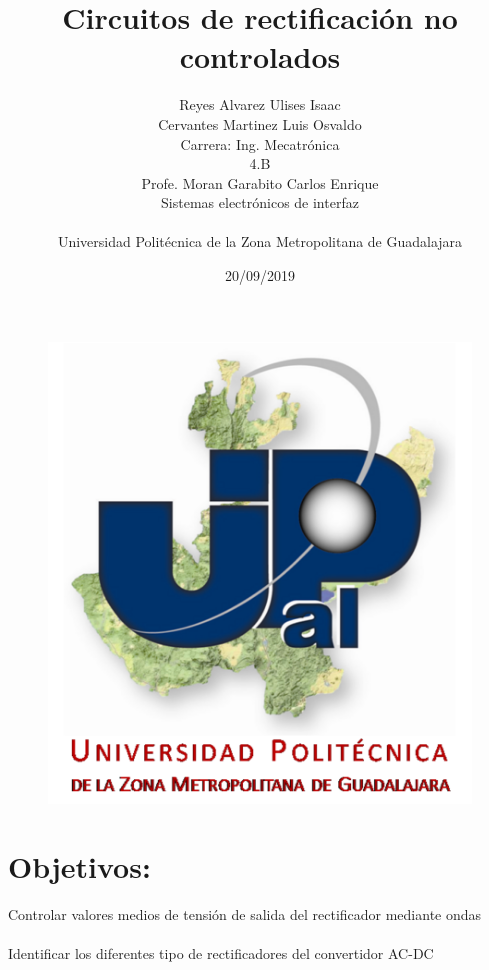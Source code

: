 \documentclass[12pt,a4paper]{article}
\author{Reyes Alvarez Ulises Isaac\\Cervantes Martinez Luis Osvaldo\\Carrera: Ing. Mecatrónica\\4.B\\Profe. Moran Garabito Carlos Enrique\\Sistemas electrónicos de interfaz\\\\ Universidad Politécnica de la Zona Metropolitana de Guadalajara}
\title{Circuitos de rectificación no controlados}
\date{20/09/2019}
\begin{document}
\maketitle
\begin{figure}[hbtp]
\centering
\includegraphics[scale=1]{UPZMG.png}
\end{figure}

\section*{Objetivos:}
Controlar valores medios de tensión de salida del rectificador mediante ondas\\\\
Identificar los diferentes tipo de rectificadores del convertidor AC-DC

\newpage
\end{document}
